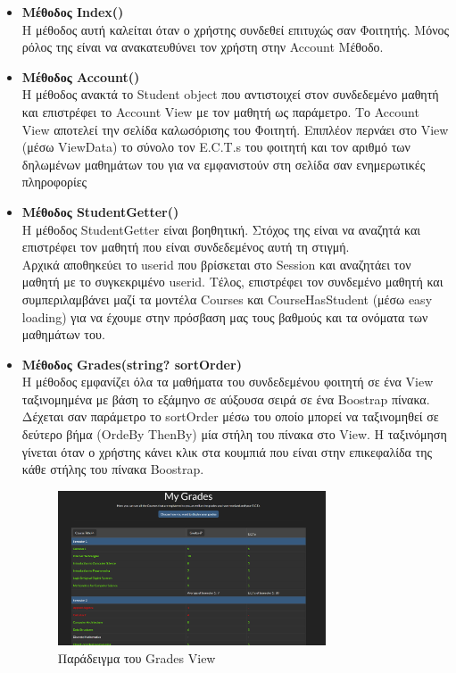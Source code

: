 \documentclass[12pt]{article}
\begin{document}
\begin{itemize}
	
	\item \textbf{Μέθοδος Index()}\\
	Η μέθοδος αυτή καλείται όταν ο χρήστης συνδεθεί επιτυχώς σαν Φοιτητής. Μόνος ρόλος της είναι να ανακατευθύνει τον χρήστη στην Account Μέθοδο.			
	
	\item	\textbf{Μέθοδος Account()}\\
	Η μέθοδος ανακτά το Student object που αντιστοιχεί στον συνδεδεμένο μαθητή και επιστρέφει το Account View με τον μαθητή ως παράμετρο. Το Account View αποτελεί την σελίδα καλωσόρισης του Φοιτητή. Επιπλέον περνάει στο View (μέσω ViewData) το σύνολο τον E.C.T.s του φοιτητή και τον αριθμό των δηλωμένων μαθημάτων του για να εμφανιστούν στη σελίδα σαν ενημερωτικές πληροφορίες
	
	\item \textbf{Μέθοδος StudentGetter()}\\		
	Η μέθοδος StudentGetter είναι βοηθητική. Στόχος της είναι να αναζητά και επιστρέφει τον μαθητή που είναι συνδεδεμένος αυτή τη στιγμή.\\
	Αρχικά αποθηκεύει το userid που βρίσκεται στο Session και αναζητάει τον μαθητή με το συγκεκριμένο userid. Τέλος, επιστρέφει τον συνδεμένο μαθητή και συμπεριλαμβάνει μαζί τα μοντέλα Courses και CourseHasStudent (μέσω easy loading) για να έχουμε στην πρόσβαση μας τους βαθμούς και τα ονόματα των μαθημάτων του.

	\item \textbf{Μέθοδος Grades(string? sortOrder)}\\
	Η μέθοδος εμφανίζει όλα τα μαθήματα του συνδεδεμένου φοιτητή σε ένα View ταξινομημένα με βάση το εξάμηνο σε αύξουσα σειρά σε ένα Boostrap πίνακα. Δέχεται σαν παράμετρο το sortOrder μέσω του οποίο μπορεί να ταξινομηθεί σε δεύτερο βήμα (OrdeBy ThenBy) μία στήλη του πίνακα στο View. Η ταξινόμηση γίνεται όταν ο χρήστης κάνει κλικ στα κουμπιά που είναι στην επικεφαλίδα της κάθε στήλης του πίνακα Boostrap.
	
 	 \begin{figure}[H]
	\centering
	\includegraphics[width=0.75\textwidth]{grades.png}
	\caption{Παράδειγμα του Grades View }
	\label{fig:emptyView}
	\end{figure}


\end{itemize}
\end{document}
